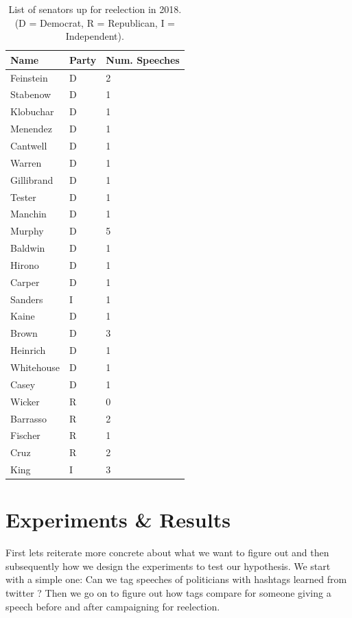 \documentclass[10pt,conference,compsocconf]{IEEEtran}
\begin{document}
\begin{table}[]
	\centering
	\begin{tabular}{@{}lll@{}}
		\toprule
		Name       & Party      & Num. Speeches \\ \midrule
		Feinstein  & D   &       2        \\
		Stabenow   & D   &       1        \\
		Klobuchar  & D   &     1          \\
		Menendez   & D   &     1          \\
		Cantwell   & D   &      1         \\
		Warren     & D   &   1            \\
		Gillibrand & D   &        1       \\
		Tester     & D   &     1          \\
		Manchin    & D   &      1         \\
		Murphy     & D   &     5          \\
		Baldwin    & D   &       1        \\
		Hirono     & D   &        1       \\
		Carper     & D   &      1         \\
		Sanders    & I   &      1         \\
		Kaine      & D   &         1      \\
		Brown      & D   &      3         \\
		Heinrich   & D   &       1        \\
		Whitehouse & D   &     1          \\
		Casey      & D   &     1          \\
		Wicker     & R &         0      \\
		Barrasso   & R &    2           \\
		Fischer    & R &         1      \\
		Cruz       & R &      2         \\
		King       & I &     3          \\ \bottomrule
	\end{tabular}
	\caption{List of senators up for reelection in 2018. (D = Democrat, R = Republican, I = Independent).}
	\label{tbl:senators}
\end{table}


\section{Experiments \& Results}
\label{sec:Experiments}
First lets reiterate more concrete about what we want to figure out and then subsequently how we design the experiments to test our hypothesis. 
We start with a simple one: Can we tag speeches of politicians with hashtags learned from twitter ? Then we go on to figure out how tags compare for someone giving a speech before and after campaigning for reelection. 
\end{document}
